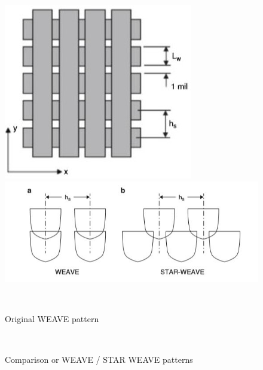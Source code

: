 \documentclass[a4paper, twoside, 11pt]{report}
\begin{document}
\begin{figure}[h]
  \centering
  \begin{minipage}[b]{0.45\textwidth}
    \includegraphics[width=\textwidth]{weave1}
  \end{minipage}
  \hfill
  \begin{minipage}[b]{0.45\textwidth}
    \includegraphics[width=\textwidth]{weave2}
  \end{minipage}
  \\[1pt]
  \begin{minipage}[t]{0.45\textwidth}
    \caption{Original WEAVE pattern}
  \end{minipage}
  \hfill
  \begin{minipage}[t]{0.45\textwidth}
    \caption{Comparison or WEAVE / STAR WEAVE patterns}
  \end{minipage}
  \\[10pt]
  \begin{minipage}[t]{\textwidth}

\end{minipage}
\end{figure}
\end{document}
